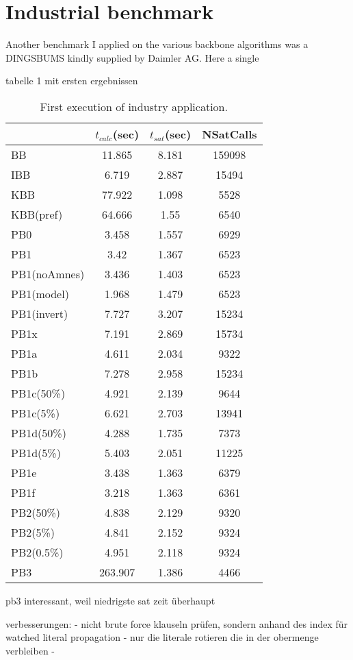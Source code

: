 \section{Industrial benchmark}

Another benchmark I applied on the various backbone algorithms was a DINGSBUMS kindly supplied by Daimler AG. Here a single 


tabelle 1 mit ersten ergebnissen

\begin{table}[h!] %

\label{tab:vonThore1} %
\begin{tabular}{l| c c c }
&	$t_{calc}$(sec) &	$t_{sat}$(sec)	& NSatCalls \\
\hline
BB & 11.865 & 8.181 & 159098 \\
IBB & 6.719 & 2.887 & 15494 \\
KBB & 77.922 & 1.098 & 5528 \\
KBB(pref) & 64.666 & 1.55 & 6540 \\
PB0 & 3.458 & 1.557 & 6929 \\
PB1 & 3.42 & 1.367 & 6523 \\
PB1(noAmnes) & 3.436 & 1.403 & 6523 \\
PB1(model) & 1.968 & 1.479 & 6523 \\
PB1(invert) & 7.727 & 3.207 & 15234 \\
PB1x & 7.191 & 2.869 & 15734 \\
PB1a & 4.611 & 2.034 & 9322 \\
PB1b & 7.278 & 2.958 & 15234 \\
PB1c(50\%) & 4.921 & 2.139 & 9644 \\
PB1c(5\%) & 6.621 & 2.703 & 13941 \\
PB1d(50\%) & 4.288 & 1.735 & 7373 \\
PB1d(5\%) & 5.403 & 2.051 & 11225 \\
PB1e & 3.438 & 1.363 & 6379 \\
PB1f & 3.218 & 1.363 & 6361 \\
PB2(50\%) & 4.838 & 2.129 & 9320 \\
PB2(5\%) & 4.841 & 2.152 & 9324 \\
PB2(0.5\%) & 4.951 & 2.118 & 9324 \\
PB3 & 263.907 & 1.386 & 4466 \\
\end{tabular}
\caption{First execution of industry application.}
\end{table}

pb3 interessant, weil niedrigste sat zeit überhaupt

verbesserungen:
- nicht brute force klauseln prüfen, sondern anhand des index für watched literal propagation
- nur die literale rotieren die in der obermenge verbleiben
- 